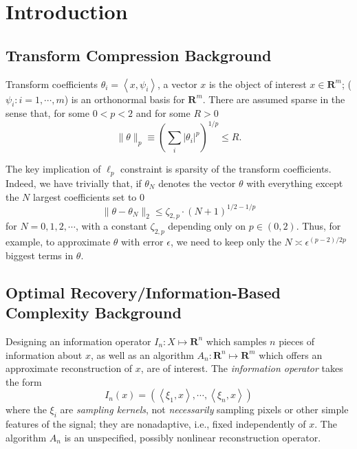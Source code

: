 \section{Introduction}
\subsection{Transform Compression Background}
\textcolor[rgb]{1,0,0}{Transform coefficients} $\theta_i = \left<x,\psi_i\right>$, a vector $x$ is the object of interest $x \in \mathbf{R}^m$; ($\psi_i: i=1, \cdots, m$) is an orthonormal basis for $\mathbf{R}^m$. There are assumed sparse in the sense that, for some $0<p<2$ and for some $R>0$
\begin{equation}
    \|\theta\|_p \equiv \left(\sum\limits_i|\theta_i|^p\right)^{1/p} \leq R.
    \label{eq3.1.1}
\end{equation}

The key implication of $\ell_p$ constraint is sparsity of the transform coefficients. Indeed, we have trivially that, if $\theta_N$ denotes the vector $\theta$ with everything except the $N$ largest coefficients set to $0$
\begin{equation}
    \|\theta - \theta_N \|_2 \leq \zeta_{2,p} \cdot (N+1)^{1/2-1/p}
    \label{eq3.1.2}
\end{equation}
for $N = 0,1,2,\cdots$, with a constant $\zeta_{2,p}$ depending only on $p \in (0,2)$. Thus, for example, to approximate $\theta$ with error $\epsilon$, we need to keep only the $N \asymp \epsilon^{(p-2)/2p}$ biggest terms in $\theta$. 

\subsection{Optimal Recovery/Information-Based Complexity Background}
Designing an information operator $I_n:X \longmapsto \mathbf{R}^n$ which samples $n$ pieces of information about $x$, as well as an algorithm $A_n:\mathbf{R}^n \longmapsto \mathbf{R}^m$ which offers an approximate reconstruction of $x$, are of interest. The \emph{\textcolor[rgb]{1,0,0}{information operator}} takes the form  
\begin{equation*}
    I_n(x) = \left(\left<\xi_1,x\right>,\cdots,\left<\xi_n,x\right>\right)
\end{equation*}
where the $\xi_i$ are \emph{\textcolor[rgb]{1,0,0}{sampling kernels}}, not \emph{\textcolor[rgb]{0,0,1}{necessarily}} sampling pixels or other simple features of the signal; they are nonadaptive, i.e., fixed independently of $x$. The algorithm $A_n$ is an unspecified, possibly nonlinear reconstruction operator. 

